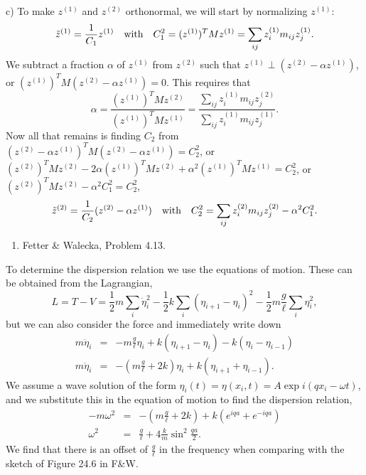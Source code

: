 \documentclass[letterpaper,11pt]{article}
\begin{document}
c) To make $z^{(1)}$ and $z^{(2)}$ orthonormal, we will start by normalizing $z^{(1)}$:
\begin{equation*}
 \tilde{z}^{(1)} = \frac{1}{C_1} z^{(1)} \quad \hbox{with} \quad C_1^2 = (z^{(1)})^T M z^{(1)} = \sum_{ij} z^{(1)}_i m_{ij} z^{(1)}_j.
\end{equation*}
We subtract a fraction $\alpha$ of $z^{(1)}$ from $z^{(2)}$ such that $z^{(1)} \perp (z^{(2)} - \alpha z^{(1)})$, or $(z^{(1)})^T M (z^{(2)} - \alpha z^{(1)}) = 0$.  This requires that
\begin{equation*}
 \alpha = \frac{(z^{(1)})^T M z^{(2)}}{(z^{(1)})^T M z^{(1)}} = \frac{\sum_{ij} z^{(1)}_i m_{ij} z^{(2)}_j}{\sum_{ij} z^{(1)}_i m_{ij} z^{(1)}_j}.
\end{equation*}
Now all that remains is finding $C_2$ from $(z^{(2)} - \alpha z^{(1)})^T M (z^{(2)} - \alpha z^{(1)}) = C_2^2$, or $(z^{(2)})^T M z^{(2)} - 2 \alpha (z^{(1)})^T M z^{(2)} + \alpha^2 (z^{(1)})^T M z^{(1)} = C_2^2$, or $(z^{(2)})^T M z^{(2)} - \alpha^2 C_1^2 = C_2^2$,
\begin{equation*}
 \tilde{z}^{(2)} = \frac{1}{C_2} (z^{(2)} - \alpha z^{(1)}) \quad \hbox{with} \quad C_2^2 = \sum_{ij} z^{(2)}_i m_{ij} z^{(2)}_j - \alpha^2 C_1^2.
\end{equation*}

\begin{enumerate}[resume]
 \item Fetter \& Walecka, Problem 4.13.
\end{enumerate}
To determine the dispersion relation we use the equations of motion.  These can be obtained from the Lagrangian,
\begin{equation*}
 L = T - V = \frac{1}{2} m \sum_i \dot\eta_i^2 - \frac{1}{2} k \sum_i (\eta_{i+1} - \eta_i)^2 - \frac{1}{2} m \frac{g}{\ell} \sum_i \eta_i^2,
\end{equation*}
but we can also consider the force and immediately write down
\begin{eqnarray*}
 m \ddot\eta_i & = & - m \frac{g}{\ell} \eta_i + k (\eta_{i+1} - \eta_i) - k (\eta_i - \eta_{i-1}) \\
 m \ddot\eta_i & = & - (m \frac{g}{\ell} + 2 k) \eta_i  + k (\eta_{i+1} + \eta_{i-1}).
\end{eqnarray*}
We assume a wave solution of the form $\eta_i(t) = \eta(x_i,t) = A \exp i(q x_i - \omega t)$, and we substitute this in the equation of motion to find the dispersion relation,
\begin{eqnarray*}
 - m \omega^2 & = & - (m \frac{g}{\ell} + 2 k) + k (e^{iqa} + e^{-iqa}) \\
 \omega^2 & = & \frac{g}{\ell} + 4 \frac{k}{m} \sin^2 \frac{qa}{2}.
\end{eqnarray*}
We find that there is an offset of $\frac{g}{\ell}$ in the frequency when comparing with the sketch of Figure 24.6 in F\&W.
\end{document}
